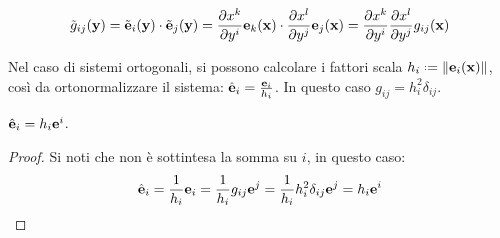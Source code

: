 \begin{equation}
	\tilde{g}_{ij} (\mathbf{y}) = \tilde{\mathbf{e}}_i (\mathbf{y}) \cdot \tilde{\mathbf{e}}_j (\mathbf{y}) = \frac{\partial x^k}{\partial y^i} \mathbf{e}_k (\mathbf{x}) \cdot \frac{\partial x^l}{\partial y^j} \mathbf{e}_j (\mathbf{x}) = \frac{\partial x^k}{\partial y^i} \frac{\partial x^l}{\partial y^j} g_{ij} (\mathbf{x})
	\label{eq:1.16}
\end{equation}

Nel caso di sistemi ortogonali, si possono calcolare i fattori scala $ h_i \defeq \norm{\ve{e}_i(\ve{x})} $, così da ortonormalizzare il sistema: $ \hat{\mathbf{e}}_i = \frac{\mathbf{e}_i}{h_i} $. In questo caso $ g_{ij} = h_i^2 \delta_{ij} $.

\begin{proposition}
	$ \hat{\mathbf{e}}_i = h_i \mathbf{e}^i $.
\end{proposition}
\begin{proof}
	Si noti che non è sottintesa la somma su $ i $, in questo caso:
	\begin{equation*}
		\hat{\mathbf{e}}_i = \frac{1}{h_i} \mathbf{e}_i = \frac{1}{h_i} g_{ij} \mathbf{e}^j = \frac{1}{h_i} h_i^2 \delta_{ij} \mathbf{e}^j = h_i \mathbf{e}^i
	\end{equation*}
\end{proof}










